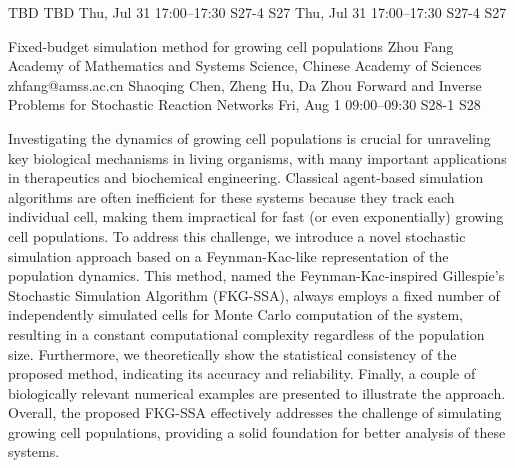 \begin{talk}
  {TBD}%
  {TBD}%
  {Thu, Jul 31 17:00–17:30}%
  {S27-4}%
  {S27}%
  {}%
  {Thu, Jul 31 17:00–17:30}%
  {S27-4}%
  {S27}%
\end{talk}

\begin{talk}
  {Fixed-budget simulation method for growing cell populations}%
  {Zhou Fang}%
  {Academy of Mathematics and Systems Science, Chinese Academy of Sciences}%
  {zhfang@amss.ac.cn}%
  {Shaoqing Chen, Zheng Hu, Da Zhou}%
  {Forward and Inverse Problems for Stochastic Reaction Networks}%
  {Fri, Aug 1 09:00–09:30}%
  {S28-1}%
  {S28}%
				
			
Investigating the dynamics of growing cell populations is crucial for unraveling key biological mechanisms in living organisms, with many important applications in therapeutics and biochemical engineering. Classical agent-based simulation algorithms are often inefficient for these systems because
they track each individual cell, making them impractical for fast (or even exponentially) growing
cell populations. To address this challenge, we introduce a novel stochastic simulation approach
based on a Feynman-Kac-like representation of the population dynamics. This method, named the
Feynman-Kac-inspired Gillespie’s Stochastic Simulation Algorithm (FKG-SSA), always employs a
fixed number of independently simulated cells for Monte Carlo computation of the system, resulting in a constant computational complexity regardless of the population size. Furthermore, we
theoretically show the statistical consistency of the proposed method, indicating its accuracy and
reliability. Finally, a couple of biologically relevant numerical examples are presented to illustrate the
approach. Overall, the proposed FKG-SSA effectively addresses the challenge of simulating growing
cell populations, providing a solid foundation for better analysis of these systems.


\end{talk}

